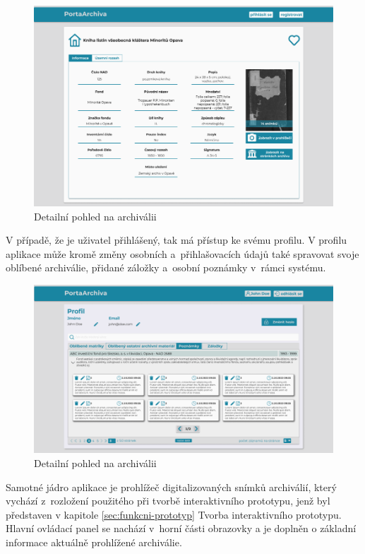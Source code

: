 \begin{figure}[htbp]
\centering
    \includegraphics[scale=.4]{obrazky-figures/design/figma/Detail page - info.png}
    \caption{Detailní pohled na archiválii}
\end{figure}

\newpage
\noindent
V případě, že je uživatel přihlášený, tak má přístup ke svému profilu. V profilu aplikace může kromě změny osobních a~přihlašovacích údajů také spravovat svoje oblíbené archiválie, přidané záložky a~osobní poznámky v~rámci systému.

\begin{figure}[htbp]
\centering
    \includegraphics[scale=.4]{obrazky-figures/design/figma/Profile page - note page open.png}
    \caption{Detailní pohled na archiválii}
\end{figure}
\newpage
Samotné jádro aplikace je prohlížeč digitalizovaných snímků archiválií, který vychází z~rozložení použitého při tvorbě interaktivního prototypu, jenž byl představen v kapitole \ref{sec:funkcni-prototyp} Tvorba interaktivního prototypu. Hlavní ovládací panel se nachází v~horní části obrazovky a je doplněn o základní informace aktuálně prohlížené archiválie. 

